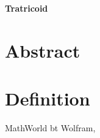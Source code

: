 \documentclass[12pt,dvipdfmx]{article}
\begin{document}
\begin{center}

{\bf \Large Tratricoid}

\end{center}


\section{Abstract}


\section{Definition}



\begin{thebibliography}{9}

 MathWorld bt Wolfram, \verb||


\end{thebibliography}
\end{document}
